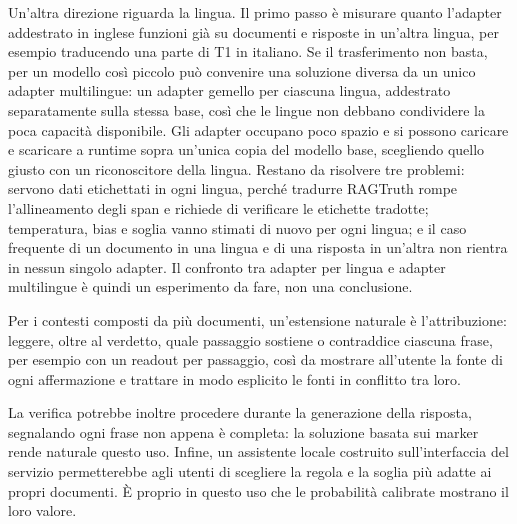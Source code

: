 Un'altra direzione riguarda la lingua. Il primo passo è misurare quanto l'adapter addestrato in inglese funzioni già
su documenti e risposte in un'altra lingua, per esempio traducendo una parte di T1 in italiano. Se il trasferimento non
basta, per un modello così piccolo può convenire una soluzione diversa da un unico adapter multilingue: un adapter
gemello per ciascuna lingua, addestrato separatamente sulla stessa base, così che le lingue non debbano condividere la
poca capacità disponibile. Gli adapter occupano poco spazio e si possono caricare e scaricare a runtime sopra un'unica
copia del modello base, scegliendo quello giusto con un riconoscitore della lingua. Restano da risolvere tre problemi:
servono dati etichettati in ogni lingua, perché tradurre RAGTruth rompe l'allineamento degli span e richiede di
verificare le etichette tradotte; temperatura, bias e soglia vanno stimati di nuovo per ogni lingua; e il caso frequente
di un documento in una lingua e di una risposta in un'altra non rientra in nessun singolo adapter. Il confronto tra
adapter per lingua e adapter multilingue è quindi un esperimento da fare, non una conclusione.

Per i contesti composti da più documenti, un'estensione naturale è l'attribuzione: leggere, oltre al verdetto, quale
passaggio sostiene o contraddice ciascuna frase, per esempio con un readout per passaggio, così da mostrare all'utente
la fonte di ogni affermazione e trattare in modo esplicito le fonti in conflitto tra loro.

La verifica potrebbe inoltre procedere durante la generazione della risposta, segnalando ogni frase non appena è
completa: la soluzione basata sui marker rende naturale questo uso. Infine, un assistente locale costruito
sull'interfaccia del servizio permetterebbe agli utenti di scegliere la regola e la soglia più adatte ai propri
documenti. È proprio in questo uso che le probabilità calibrate mostrano il loro valore.

